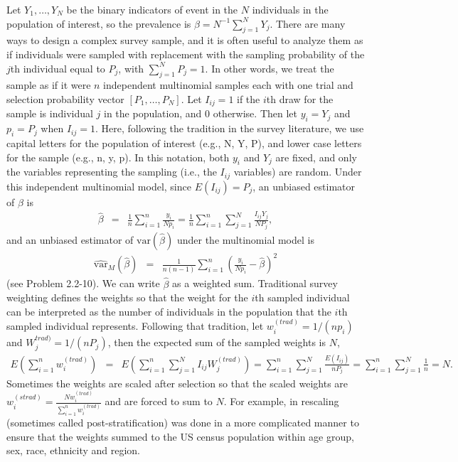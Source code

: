 Let $Y_1,\ldots, Y_N$ be the binary indicators of event in the $N$ individuals in the population of interest,
so the prevalence is $\beta = N^{-1} \sum_{j=1}^{N} Y_j$. There are many ways to design a complex survey sample, and it is often useful to analyze them as if
individuals were sampled with replacement with the sampling probability of the $j$th individual equal to $P_j$, with $\sum_{j=1}^{N} P_j = 1.$
In other words, we treat the sample as if it were $n$ independent multinomial samples each with one trial and selection probability vector $[P_1,\ldots, P_N]$.
Let $I_{ij}=1$ if the $i$th draw for the sample is individual $j$ in the population, and $0$ otherwise. Then let $y_i = Y_j$ and $p_i=P_j$ when $I_{ij}=1$.
Here, following the tradition in the survey literature, we use capital letters for the population of interest (e.g., N, Y, P), and lower case letters for the sample (e.g., n, y, p).
In this notation, both $y_i$ and $Y_j$ are fixed, and only the variables representing the sampling (i.e., the $I_{ij}$ variables) are random.
Under this independent multinomial model, since $E(I_{ij})=P_j$, an unbiased estimator of $\beta$ is
\begin{eqnarray}
\hat{\beta} & = & \frac{1}{n} \sum_{i=1}^{n} \frac{ y_i}{N p_i} = \frac{1}{n} \sum_{i=1}^{n} \sum_{j=1}^{N} \frac{ I_{ij} Y_j}{N P_j},
\label{ch_3:eq:betahatMultinomial}
\end{eqnarray}
and an unbiased estimator of $\textrm{var}(\hat{\beta})$ under the multinomial model is
\begin{eqnarray}
\widehat{\textrm{var}}_{M}(\hat{\beta}) & = & \frac{1}{n (n-1)} \sum_{i=1}^{n} \left( \frac{y_i}{Np_i} - \hat{\beta} \right)^2
\label{ch_3:eq:varMbetahat}
\end{eqnarray}
(see \citep{Korn:1999} Problem 2.2-10). We can write $\hat{\beta}$ as a weighted sum. Traditional survey weighting defines the weights so that
the weight for the $i$th sampled individual can be interpreted as the number of individuals in the population that the $i$th sampled individual represents.
Following that tradition, let $w_i^{(trad)}= 1/(np_i)$ and $W_j^{trad)}=1/(nP_j)$, then the expected sum of the sampled weights is $N$,
\begin{eqnarray*}
E \left( \sum_{i=1}^{n} w_i^{(trad)} \right) & = & E \left( \sum_{i=1}^{n} \sum_{j=1}^{N} I_{ij} W_j^{(trad)} \right) = \sum_{i=1}^{n} \sum_{j=1}^{N} \frac{ E(I_{ij})}{ n P_j} = \sum_{i=1}^{n} \sum_{j=1}^{N} \frac{1}{n} = N.
\end{eqnarray*}
Sometimes the weights are scaled after selection so that the scaled weights are $w_i^{(strad)} = \frac{ N w_i^{(trad)} }{\sum_{i=1}^{n} w_i^{(trad)}}$ and are forced to sum to $N$.
For example, in \citep{Kali:2021} rescaling (sometimes called post-stratification) was done in a more complicated manner to ensure that the weights summed to the US census population within age group, sex, race, ethnicity and region.



